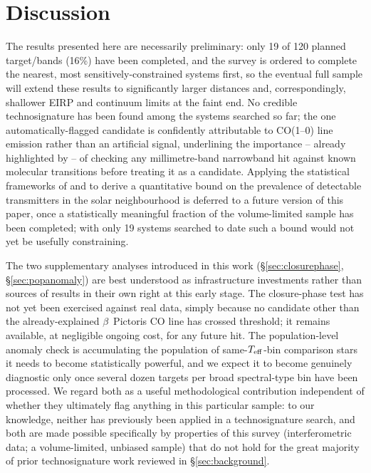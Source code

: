 \documentclass{openjournal}
\begin{document}
\section{Discussion}
\label{sec:discussion}

The results presented here are necessarily preliminary: only 19 of 120
planned target/bands (16\%) have been completed, and the survey is
ordered to complete the nearest, most sensitively-constrained systems
first, so the eventual full sample will extend these results to
significantly larger distances and, correspondingly, shallower EIRP and
continuum limits at the faint end. No credible technosignature has been
found among the systems searched so far; the one automatically-flagged
candidate is confidently attributable to CO(1--0) line emission rather
than an artificial signal, underlining the importance -- already
highlighted by \citet{Mason2024} -- of checking any millimetre-band
narrowband hit against known molecular transitions before treating it as
a candidate. Applying the statistical frameworks of \citet{Wright2018}
and \citet{Margot2023} to derive a quantitative bound on the prevalence
of detectable transmitters in the solar neighbourhood is deferred to a
future version of this paper, once a statistically meaningful fraction
of the volume-limited sample has been completed; with only 19 systems
searched to date such a bound would not yet be usefully constraining.

The two supplementary analyses introduced in this work
(\S\ref{sec:closurephase}, \S\ref{sec:popanomaly}) are best understood as
infrastructure investments rather than sources of results in their own
right at this early stage. The closure-phase test has not yet been
exercised against real data, simply because no candidate other than the
already-explained $\beta$~Pictoris CO line has crossed threshold; it
remains available, at negligible ongoing cost, for any future hit. The
population-level anomaly check is accumulating the population of
same-$T_{\rm eff}$-bin comparison stars it needs to become statistically
powerful, and we expect it to become genuinely diagnostic only once
several dozen targets per broad spectral-type bin have been processed.
We regard both as a useful methodological contribution independent of
whether they ultimately flag anything in this particular sample: to our
knowledge, neither has previously been applied in a technosignature
search, and both are made possible specifically by properties of this
survey (interferometric data; a volume-limited, unbiased sample) that do
not hold for the great majority of prior technosignature work reviewed in
\S\ref{sec:background}.
\end{document}
